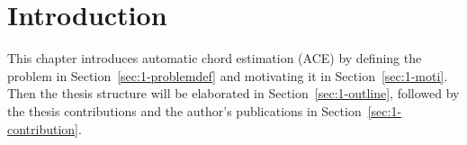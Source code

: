 

\chapter{Introduction}\label{cp:intro}





This chapter introduces automatic chord estimation (ACE) by defining the problem in Section~\ref{sec:1-problemdef} and motivating it in Section~\ref{sec:1-moti}. Then the thesis structure will be elaborated in Section~\ref{sec:1-outline}, followed by the thesis contributions and the author's publications in Section~\ref{sec:1-contribution}.

